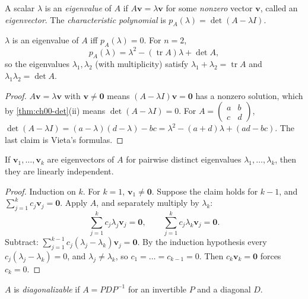 \begin{definition}\label{def:ch00-eig}
A scalar $\lambda$ is an \emph{eigenvalue} of $A$ if $A\mathbf{v} = \lambda\mathbf{v}$
for some \emph{nonzero} vector $\mathbf{v}$, called an \emph{eigenvector}. The
\emph{characteristic polynomial} is $p_A(\lambda) = \det(A - \lambda I)$.
\end{definition}

\begin{proposition}\label{prop:ch00-charpoly}
$\lambda$ is an eigenvalue of $A$ iff $p_A(\lambda)=0$. For $n=2$,
\[
  p_A(\lambda) = \lambda^2 - (\operatorname{tr}A)\lambda + \det A,
\]
so the eigenvalues $\lambda_1,\lambda_2$ (with multiplicity) satisfy
$\lambda_1 + \lambda_2 = \operatorname{tr}A$ and $\lambda_1\lambda_2 = \det A$.
\end{proposition}
\begin{proof}
$A\mathbf{v} = \lambda\mathbf{v}$ with $\mathbf{v}\neq\mathbf0$ means
$(A - \lambda I)\mathbf{v} = \mathbf0$ has a nonzero solution, which by
\cref{thm:ch00-det}(ii) means $\det(A - \lambda I) = 0$. For
$A = \left(\begin{smallmatrix}a&b\\c&d\end{smallmatrix}\right)$,
$\det(A-\lambda I) = (a-\lambda)(d-\lambda) - bc = \lambda^2 - (a+d)\lambda +
(ad - bc)$. The last claim is Vieta's formulas.
\end{proof}

\begin{theorem}\label{thm:ch00-indep}
If $\mathbf{v}_1,\dots,\mathbf{v}_k$ are eigenvectors of $A$ for pairwise
distinct eigenvalues $\lambda_1,\dots,\lambda_k$, then they are linearly
independent.
\end{theorem}
\begin{proof}
Induction on $k$. For $k=1$, $\mathbf{v}_1\neq\mathbf0$. Suppose the claim
holds for $k-1$, and $\sum_{j=1}^k c_j\mathbf{v}_j = \mathbf0$. Apply $A$, and
separately multiply by $\lambda_k$:
\[
  \sum_{j=1}^{k} c_j\lambda_j\mathbf{v}_j = \mathbf0,\qquad
  \sum_{j=1}^{k} c_j\lambda_k\mathbf{v}_j = \mathbf0 .
\]
Subtract: $\sum_{j=1}^{k-1}c_j(\lambda_j - \lambda_k)\mathbf{v}_j = \mathbf0$. By
the induction hypothesis every $c_j(\lambda_j-\lambda_k) = 0$, and
$\lambda_j\neq\lambda_k$, so $c_1=\dots=c_{k-1}=0$. Then
$c_k\mathbf{v}_k = \mathbf0$ forces $c_k=0$.
\end{proof}

\begin{definition}\label{def:ch00-diag}
$A$ is \emph{diagonalizable} if $A = PDP^{-1}$ for an invertible $P$ and a
diagonal $D$.
\end{definition}

